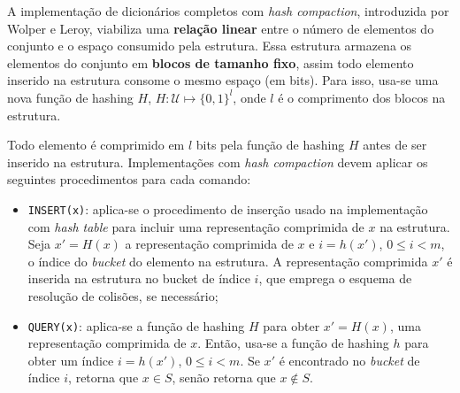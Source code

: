 \documentclass[12pt,twoside,english,brazilian]{article}
\begin{document}
A implementação de dicionários completos com \textit{hash compaction}, introduzida por Wolper e Leroy, viabiliza uma \textbf{relação linear} entre o número de elementos do conjunto e o espaço consumido pela estrutura. Essa estrutura armazena os elementos do conjunto em \textbf{blocos de tamanho fixo}, assim todo elemento inserido na estrutura consome o mesmo espaço (em bits). Para isso, usa-se uma nova função de hashing $H$, $H: \mathcal{U} \mapsto \{0, 1\}^l$, onde $l$ é o comprimento dos blocos na estrutura.

Todo elemento é comprimido em $l$ bits pela função de hashing $H$ antes de ser inserido na estrutura. Implementações com \textit{hash compaction} devem aplicar os seguintes procedimentos para cada comando:

\begin{itemize}
    \item \texttt{INSERT(x)}: aplica-se o procedimento de inserção usado na implementação com \textit{hash table} para incluir uma representação comprimida de $x$ na estrutura. Seja $x' = H(x)$ a representação comprimida de $x$ e $i = h(x')$, $0 \leq i < m$, o índice do \textit{bucket} do elemento na estrutura. A representação comprimida $x'$ é inserida na estrutura no bucket de índice $i$, que emprega o esquema de resolução de colisões, se necessário;
    \item \texttt{QUERY(x)}: aplica-se a função de hashing $H$ para obter $x' = H(x)$, uma representação comprimida de $x$. Então, usa-se a função de hashing $h$ para obter um índice $i = h(x')$, $0 \leq i < m$. Se $x'$ é encontrado no \textit{bucket} de índice $i$, retorna que $x \in S$, senão retorna que $x \notin S$.
\end{itemize}
\end{document}
